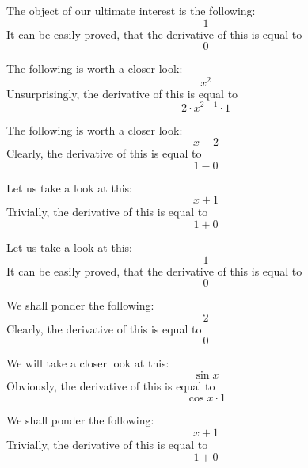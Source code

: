 \documentclass{article}
\begin{document}
The object of our ultimate interest is the following:
\begin{equation}
1 
\end{equation}
It can be easily proved, that the derivative of this is equal to
\begin{equation}
0 
\end{equation}

The following is worth a closer look:
\begin{equation}
x ^{2 } 
\end{equation}
Unsurprisingly, the derivative of this is equal to
\begin{equation}
2 \cdot x ^{2 - 1 } \cdot 1 
\end{equation}

The following is worth a closer look:
\begin{equation}
x - 2 
\end{equation}
Clearly, the derivative of this is equal to
\begin{equation}
1 - 0 
\end{equation}

Let us take a look at this:
\begin{equation}
x + 1 
\end{equation}
Trivially, the derivative of this is equal to
\begin{equation}
1 + 0 
\end{equation}

Let us take a look at this:
\begin{equation}
1 
\end{equation}
It can be easily proved, that the derivative of this is equal to
\begin{equation}
0 
\end{equation}

We shall ponder the following:
\begin{equation}
2 
\end{equation}
Clearly, the derivative of this is equal to
\begin{equation}
0 
\end{equation}

We will take a closer look at this:
\begin{equation}
\sin x 
\end{equation}
Obviously, the derivative of this is equal to
\begin{equation}
\cos x \cdot 1 
\end{equation}

We shall ponder the following:
\begin{equation}
x + 1 
\end{equation}
Trivially, the derivative of this is equal to
\begin{equation}
1 + 0 
\end{equation}
\end{document}

